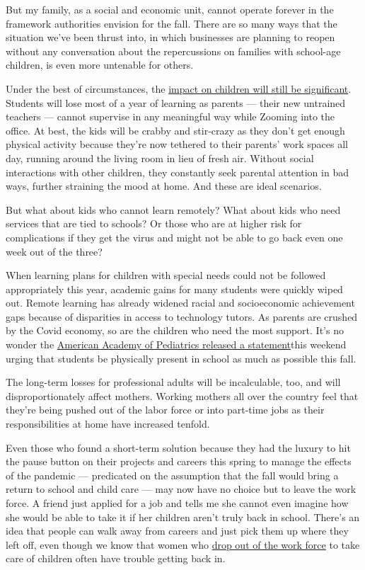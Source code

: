 But my family, as a social and economic unit, cannot operate forever in
the framework authorities envision for the fall. There are so many ways
that the situation we've been thrust into, in which businesses are
planning to reopen without any conversation about the repercussions on
families with school-age children, is even more untenable for others.

Under the best of circumstances, the
\href{https://www.nytimes3xbfgragh.onion/2020/06/05/us/coronavirus-education-lost-learning.html}{impact
on children will still be significant}. Students will lose most of a
year of learning as parents --- their new untrained teachers --- cannot
supervise in any meaningful way while Zooming into the office. At best,
the kids will be crabby and stir-crazy as they don't get enough physical
activity because they're now tethered to their parents' work spaces all
day, running around the living room in lieu of fresh air. Without social
interactions with other children, they constantly seek parental
attention in bad ways, further straining the mood at home. And these are
ideal scenarios.

But what about kids who cannot learn remotely? What about kids who need
services that are tied to schools? Or those who are at higher risk for
complications if they get the virus and might not be able to go back
even one week out of the three?

When learning plans for children with special needs could not be
followed appropriately this year, academic gains for many students were
quickly wiped out. Remote learning has already widened racial and
socioeconomic achievement gaps because of disparities in access to
technology tutors. As parents are crushed by the Covid economy, so are
the children who need the most support. It's no wonder the
\href{https://www.nytimes3xbfgragh.onion/2020/06/30/us/coronavirus-schools-reopening-guidelines-aap.html}{American
Academy of Pediatrics released a statement}this weekend urging that
students be physically present in school as much as possible this fall.

The long-term losses for professional adults will be incalculable, too,
and will disproportionately affect mothers. Working mothers all over the
country feel that they're being pushed out of the labor force or into
part-time jobs as their responsibilities at home have increased tenfold.

Even those who found a short-term solution because they had the luxury
to hit the pause button on their projects and careers this spring to
manage the effects of the pandemic --- predicated on the assumption that
the fall would bring a return to school and child care --- may now have
no choice but to leave the work force. A friend just applied for a job
and tells me she cannot even imagine how she would be able to take it if
her children aren't truly back in school. There's an idea that people
can walk away from careers and just pick them up where they left off,
even though we know that women who
\href{https://www.nytimes3xbfgragh.onion/2014/09/07/upshot/a-child-helps-your-career-if-youre-a-man.html}{drop
out of the work force} to take care of children often have trouble
getting back in.

